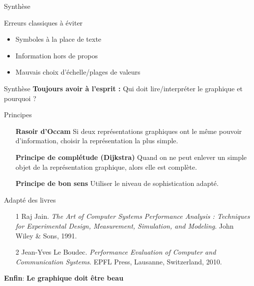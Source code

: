 \documentclass[xcolor=x11names,compress,8pt,fleqn]{beamer}
\renewcommand{\(}{\begin{columns}}
\renewcommand{\)}{\end{columns}}
\newcommand{\<}[1]{\begin{column}{#1}}
\renewcommand{\>}{\end{column}}
\begin{document}
\begin{frame}{Synthèse}
\begin{exampleblock}{Erreurs classiques à éviter}
\begin{itemize}
\item Symboles à la place de texte
\item Information hors de propos
\item Mauvais choix d'échelle/plages de valeurs
\end{itemize}
\end{exampleblock}
\end{frame}
\begin{frame}{Synthèse}
\textbf{Toujours avoir à l'esprit :} Qui doit lire/interpréter le graphique et pourquoi ?

\begin{alertblock}{Principes}
\begin{itemize}
\item[] \textbf{\alert{Rasoir d'Occam}} Si deux représentations graphiques ont le même pouvoir d'information, choisir la représentation la plus simple.
\item[] \textbf{\alert{Principe de complétude (Dijkstra)}}  Quand on ne peut enlever un simple objet de la représentation graphique, alors elle est complète.
\item[] \textbf{\alert{Principe de bon sens}} Utiliser le niveau de sophistication adapté.
\end{itemize}
Adapté des livres 
\begin{itemize}
\item[1] Raj Jain. \textit{The Art of Computer Systems Performance Analysis : Techniques for Experimental Design, Measurement, Simulation, and Modeling}. John Wiley \& Sons, 1991.
\item[2] Jean-Yves Le Boudec. \textit{Performance Evaluation of Computer and Communication Systems}. EPFL Press, Lausanne, Switzerland, 2010.
\end{itemize}
\end{alertblock}
\begin{center}
{\large \textbf{Enfin}}: {\large \textbf{\alert{Le graphique doit être beau}}}
\end{center}
\end{frame}
\end{document}

